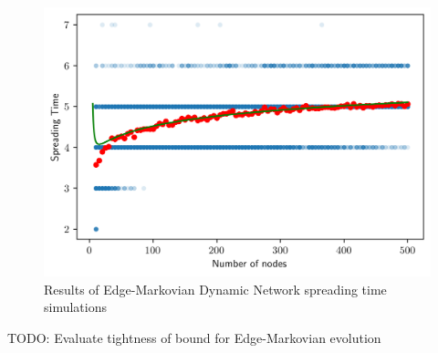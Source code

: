 \begin{figure}[h]
	\centering
	\includegraphics[width=1\textwidth]{./figures/flooding_gnp_simulation_results.png}
	\caption{Results of Edge-Markovian Dynamic Network spreading time simulations}
	\label{fig:floodingGnpSimResults}
\end{figure}

TODO: Evaluate tightness of bound for Edge-Markovian evolution